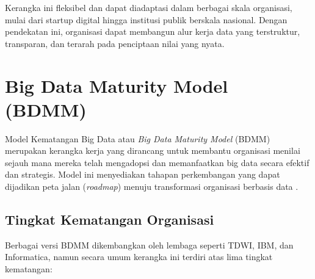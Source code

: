 Kerangka ini fleksibel dan dapat diadaptasi dalam berbagai skala organisasi, mulai dari startup digital hingga institusi publik berskala nasional. Dengan pendekatan ini, organisasi dapat membangun alur kerja data yang terstruktur, transparan, dan terarah pada penciptaan nilai yang nyata.



\section{Big Data Maturity Model (BDMM)}

Model Kematangan Big Data atau \textit{Big Data Maturity Model} (BDMM) merupakan kerangka kerja yang dirancang untuk membantu organisasi menilai sejauh mana mereka telah mengadopsi dan memanfaatkan big data secara efektif dan strategis. Model ini menyediakan tahapan perkembangan yang dapat dijadikan peta jalan (\textit{roadmap}) menuju transformasi organisasi berbasis data \cite{wan2019}.

\subsection{Tingkat Kematangan Organisasi}

Berbagai versi BDMM dikembangkan oleh lembaga seperti TDWI, IBM, dan Informatica, namun secara umum kerangka ini terdiri atas lima tingkat kematangan:

